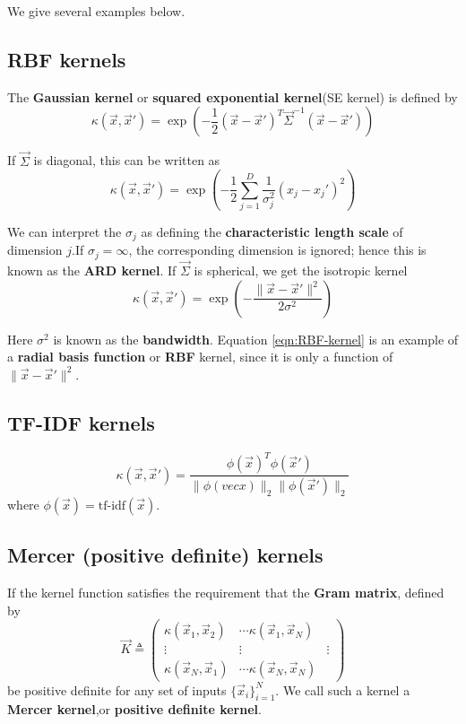 We give several examples below.

\subsection{RBF kernels}
The \textbf{Gaussian kernel} or \textbf{squared exponential kernel}(SE kernel) is defined by
\begin{equation}
\kappa(\vec{x},\vec{x}')=\exp\left(-\frac{1}{2}(\vec{x}-\vec{x}')^T\vec{\Sigma}^{-1}(\vec{x}-\vec{x}')\right)
\end{equation}

If $\vec{\Sigma}$ is diagonal, this can be written as
\begin{equation}
\kappa(\vec{x},\vec{x}')=\exp\left(-\frac{1}{2}\sum\limits_{j=1}^D \frac{1}{\sigma_j^2}(x_j-x_j')^2\right)
\end{equation}

We can interpret the $\sigma_j$ as defining the \textbf{characteristic length scale} of dimension $j$.If $\sigma_j = \infty$, the corresponding dimension is ignored; hence this is known as the \textbf{ARD kernel}. If $\vec{\Sigma}$ is spherical, we get the isotropic kernel
\begin{equation}\label{eqn:RBF-kernel}
\kappa(\vec{x},\vec{x}')=\exp\left(-\frac{\lVert\vec{x}-\vec{x}'\rVert^2}{2\sigma^2}\right)
\end{equation}

Here $\sigma^2$ is known as the \textbf{bandwidth}. Equation \ref{eqn:RBF-kernel} is an example of a \textbf{radial basis function} or \textbf{RBF} kernel, since it is only a function of $\lVert\vec{x}-\vec{x}'\rVert^2$.


\subsection{TF-IDF kernels}
\begin{equation}\label{eqn:RBF-kernel}
\kappa(\vec{x},\vec{x}')=\frac{\phi(\vec{x})^T\phi(\vec{x}')}{\lVert\phi(vec{x})\rVert_2\lVert\phi(\vec{x}')\rVert_2}
\end{equation}
where $\phi(\vec{x})=\text{tf-idf}(\vec{x})$.

\subsection{Mercer (positive definite) kernels}
\label{sec:Mercer-kernels}
If the kernel function satisfies the requirement that the \textbf{Gram matrix}, defined by
\begin{equation}
\vec{K} \triangleq \left(\begin{array}{ccc}
\kappa(\vec{x}_1,\vec{x}_2) & \cdots \kappa(\vec{x}_1,\vec{x}_N) \\
\vdots & \vdots & \vdots \\
\kappa(\vec{x}_N,\vec{x}_1) & \cdots \kappa(\vec{x}_N,\vec{x}_N) 
\end{array}\right)
\end{equation}
be positive definite for any set of inputs $\{\vec{x}_i\}_{i=1}^N$. We call such a kernel a \textbf{Mercer kernel},or \textbf{positive definite kernel}.

